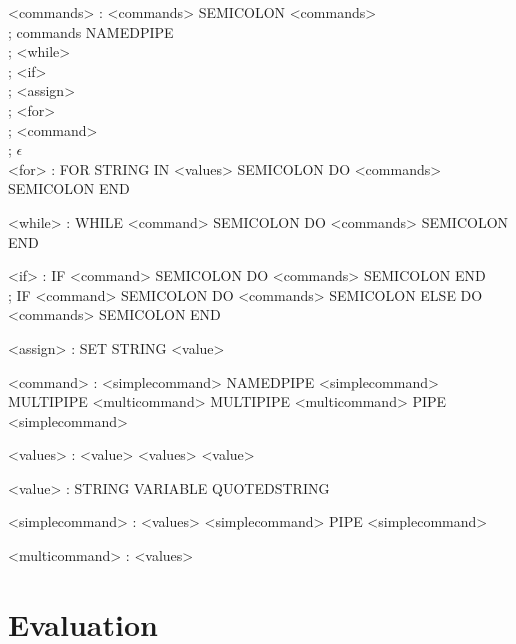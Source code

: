 \documentclass[12pt,twoside,notitlepage]{report}
\begin{document}
\begin{grammar}
<commands> : <commands> SEMICOLON <commands>\\
; commands NAMEDPIPE\\
; <while>\\
; <if>\\
; <assign>\\
; <for>\\
; <command>\\
; $\epsilon$\\

<for> : FOR STRING IN <values> SEMICOLON DO <commands> SEMICOLON END

<while> : WHILE <command> SEMICOLON DO <commands> SEMICOLON END

<if> : IF <command> SEMICOLON DO <commands> SEMICOLON END\\
; IF <command> SEMICOLON DO <commands> SEMICOLON ELSE DO <commands> SEMICOLON END

<assign> : SET STRING <value>

<command> : <simplecommand>
NAMEDPIPE <simplecommand>
MULTIPIPE <multicommand>
MULTIPIPE <multicommand> PIPE <simplecommand>

<values> : <value> <values>
<value>

<value> : STRING
VARIABLE
QUOTEDSTRING

<simplecommand> : <values>
<simplecommand> PIPE <simplecommand>
    
<multicommand> : <values>
\end{grammar}



\cleardoublepage

\chapter{Evaluation}

\end{document}
